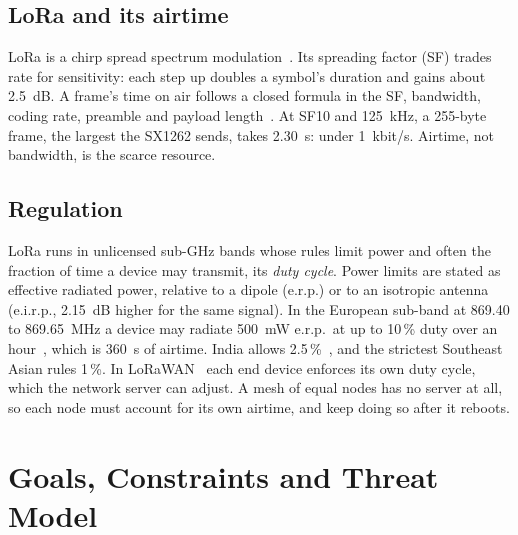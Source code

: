\documentclass[conference]{IEEEtran}
\begin{document}
\subsection{LoRa and its airtime}
LoRa is a chirp spread spectrum modulation~\cite{vangelista2017}. Its spreading factor (SF) trades rate for sensitivity: each step up doubles a symbol's duration and gains about 2.5~dB. A frame's time on air follows a closed formula in the SF, bandwidth, coding rate, preamble and payload length~\cite{sx1262}. At SF10 and 125~kHz, a 255-byte frame, the largest the SX1262 sends, takes 2.30~s: under 1~kbit/s. Airtime, not bandwidth, is the scarce resource.

\subsection{Regulation}
LoRa runs in unlicensed sub-GHz bands whose rules limit power and often the fraction of time a device may transmit, its \emph{duty cycle}. Power limits are stated as effective radiated power, relative to a dipole (e.r.p.) or to an isotropic antenna (e.i.r.p., 2.15~dB higher for the same signal). In the European sub-band at 869.40 to 869.65~MHz a device may radiate 500~mW e.r.p.\ at up to 10\,\% duty over an hour~\cite{erc7003,eu2025105}, which is 360~s of airtime. India allows 2.5\,\%~\cite{india853}, and the strictest Southeast Asian rules 1\,\%. In LoRaWAN~\cite{lorawan,lorawanrp} each end device enforces its own duty cycle, which the network server can adjust. A mesh of equal nodes has no server at all, so each node must account for its own airtime, and keep doing so after it reboots.

\section{Goals, Constraints and Threat Model}
\label{sec:goals}
\end{document}
